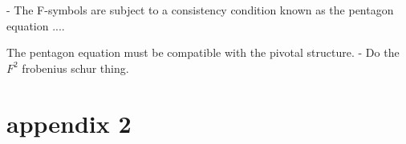 \documentclass[12pt,a4paper]{article}
\begin{document}
 - The F-symbols are subject to a consistency condition known as the pentagon equation
....

The pentagon equation must be compatible with the pivotal structure. 
- Do the $F^2$ frobenius schur thing.






\section{appendix 2}


\end{document}
